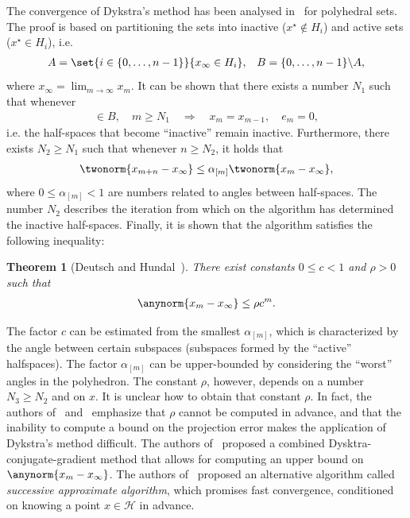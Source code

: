 \documentclass[hidelinks]{article}
\newtheorem{theorem}{Theorem}
\begin{document}
The convergence of Dykstra's method has been analysed in~\cite{DYKSTRAPOLY2,DYKSTRAPOLY,DYKSTRAPERKINS} for polyhedral sets. The proof is based on partitioning the sets into inactive ($x^\star\not\in H_i$) and active sets ($x^\star\in H_i$), i.e.\
\begin{align}
&A=\set{i\in\lbrace 0,\dots,n-1\rbrace}{x_\infty\in H_i},
&B=\lbrace 0,\dots,n-1\rbrace\backslash A,
\end{align}
where $x_\infty=\lim_{m\rightarrow\infty}x_m$. It can be shown that there exists a number $N_1$ such that whenever
\begin{align}
[m]\in B,\quad m\geq N_1\quad\Rightarrow\quad x_m=x_{m-1},\quad e_m=0,
\end{align}
i.e. the half-spaces that become ``inactive'' remain inactive. Furthermore, there exists $N_2\geq N_1$ such that whenever $n\geq N_2$, it holds that
\begin{align}\label{eq:dykstra:error:poly}
\twonorm{x_{m+n}-x_\infty}\leq\alpha_{[m]}\twonorm{x_m-x_\infty},
\end{align}
where $0\leq\alpha_{[m]}<1$ are numbers related to angles between half-spaces. The number $N_2$ describes the iteration from which on the algorithm has determined the inactive half-spaces. Finally, it is shown that the algorithm satisfies the following inequality:
\begin{theorem}[Deutsch and Hundal~\cite{DYKSTRAPOLY}]
There exist constants $0\leq c < 1$ and $\rho > 0$ such that
\begin{align*}
\anynorm{x_m -x_\infty} \leq \rho c^m.
\end{align*}
\end{theorem}
The factor $c$ can be estimated from the smallest $\alpha_{[m]}$, which is characterized by the angle between certain subspaces (subspaces formed by the ``active'' halfspaces). The factor $\alpha_{[m]}$ can be upper-bounded by considering the ``worst'' angles in the polyhedron. The constant $\rho$, however, depends on a number $N_3\geq N_2$ and on $x$. It is unclear how to obtain that constant $\rho$. In fact, the authors of~\cite{DYKSTRAPERKINS} and~\cite{XUPOLY} emphasize that $\rho$ cannot be computed in advance, and that the inability to compute a bound on the projection error makes the application of Dykstra's method difficult. The authors of~\cite{DYKSTRAPERKINS} proposed a combined Dysktra-conjugate-gradient method that allows for computing an upper bound on $\anynorm{x_m -x_\infty}$. The authors of~\cite{XUPOLY} proposed an alternative algorithm called \emph{successive approximate algorithm}, which promises fast convergence, conditioned on knowing a point $x\in\mathcal{H}$ in advance.
\end{document}
